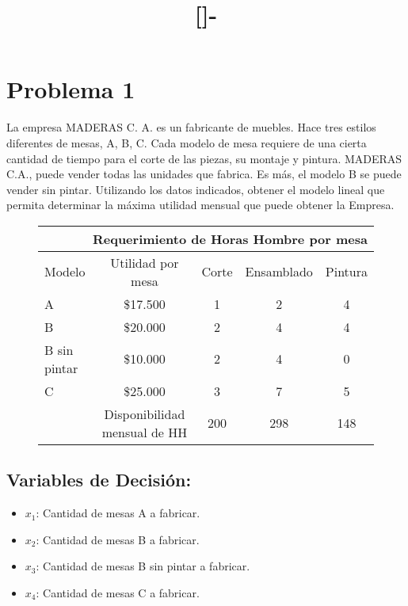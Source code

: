 \documentclass{templateNote}
\begin{document}

\title{[\asignatura]-\titulo}
\author{
    \autor
}
\portada
\margenes %

\section*{Problema 1}

La empresa MADERAS C. A. es un fabricante de muebles. Hace tres estilos diferentes de
mesas, A, B, C. Cada modelo de mesa requiere de una cierta cantidad de tiempo para el corte
de las piezas, su montaje y pintura. MADERAS C.A., puede vender todas las unidades que
fabrica. Es m\'as, el modelo B se puede vender sin pintar. Utilizando los datos indicados,
obtener el modelo lineal que permita determinar la m\'axima utilidad mensual que puede
obtener la Empresa.
\begin{figure}[H]
    \centering
    \begin{tabular}{|l|c|c|c|c|}
        \hline
        \multicolumn{5}{|r|}{Requerimiento de Horas Hombre por mesa} \\ \hline
        Modelo & Utilidad por mesa & Corte & Ensamblado & Pintura \\ \hline
        A & \$17.500 & 1 & 2 & 4 \\
        B & \$20.000 & 2 & 4 & 4 \\
        B sin pintar & \$10.000 & 2 & 4 & 0 \\
        C & \$25.000 & 3 & 7 & 5 \\ \hline
          & Disponibilidad mensual de HH & 200 & 298 & 148 \\ \hline
    \end{tabular}
\end{figure}

\subsection*{Variables de Decisión:}
\begin{itemize}
    \item $x_1$: Cantidad de mesas A a fabricar.
    \item $x_2$: Cantidad de mesas B a fabricar.
    \item $x_3$: Cantidad de mesas B sin pintar a fabricar.
    \item $x_4$: Cantidad de mesas C a fabricar.
\end{itemize}
\end{document}
